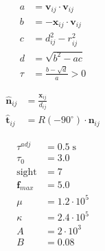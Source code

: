 \begin{align}
a &= \mathbf{v}_{ij} \cdot \mathbf{v}_{ij} \\
b &= -\mathbf{x}_{ij} \cdot \mathbf{v}_{ij} \\
c &= d_{ij}^{2} - r_{ij}^{2} \\
d &= \sqrt{b^{2} - a c} \\
\tau &= \frac{b - \sqrt{d}}{a} > 0
\end{align}

\begin{align}
\hat{\mathbf{n}}_{ij} &= \frac{\mathbf{x}_{ij}}{d_{ij}} \\
\hat{\mathbf{t}}_{ij} &= R(-90^{\circ}) \cdot \mathbf{n}_{ij}
\end{align}


\begin{align}
\tau^{adj} &= 0.5 \; \mathrm{s} \\
\tau_{0} &= 3.0 \\
\text{sight} & = 7 \\
\mathbf{f}_{max} &= 5.0 \\
\mu &= 1.2 \cdot 10^{5} \\
\kappa &= 2.4 \cdot 10^{5} \\
A &= 2\cdot 10^{3} \\
B &= 0.08
\end{align}
